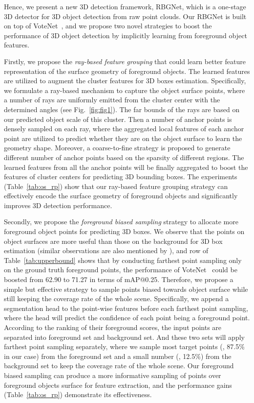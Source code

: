 \documentclass[final]{cvpr}
\begin{document}
Hence, we present a new 3D detection framework, RBGNet, which is a one-stage 3D detector for 3D object detection from raw point clouds. 
Our RBGNet is built on top of VoteNet~\cite{qi2019deep}, and we propose two novel strategies to boost the performance of 3D object detection by implicitly learning from foreground object features. 

Firstly, we propose the \textit{ray-based feature grouping} that could learn better feature representation of the surface geometry of foreground objects. The learned features are utilized to augment the cluster features for 3D boxes estimation. 
Specifically, we formulate a ray-based mechanism to capture the object surface points, where a number of rays are uniformly emitted from the cluster center with the determined angles (see Fig.~\ref{fig:fig1}). The far bounds of the rays are based on our predicted object scale of this cluster. 
Then a number of anchor points is densely sampled on each ray, where the aggregated local features of each anchor point are utilized to predict whether they are on the object surface to learn the geometry shape. 
Moreover, a coarse-to-fine strategy is proposed to generate different number of anchor points based on the sparsity of different regions. The learned features from all the anchor points will be finally aggregated to boost the features of cluster centers for predicting 3D bounding boxes. 
The experiments (Table~\ref{tab:os_rp}) show that our ray-based feature grouping strategy can effectively encode the surface geometry of foreground objects and significantly improves 3D detection performance.


Secondly, we propose the \textit{foreground biased sampling} strategy to allocate more foreground object points for predicting 3D boxes.
We observe that the points on object surfaces are more useful than those on the background for 3D box estimation (similar observations are also mentioned by \cite{yang20203dssd, shi2020pv}), and  row of Table~\ref{tab:upperbound} shows that by conducting farthest point sampling only on the ground truth foreground points, the performance of VoteNet~\cite{qi2019deep} could be boosted from 62.90 to 71.27 in terms of mAP@0.25.
Therefore, we propose a simple but effective strategy to sample points biased towards object surface while still keeping the coverage rate of the whole scene. 
Specifically, we append a segmentation head to the point-wise features before each farthest point sampling, where the head will predict the confidence of each point being a foreground point. According to the ranking of their foreground scores, the input points are separated into foreground set and background set. And these two sets will apply farthest point sampling separately, where we sample most target points (\ie, 87.5\% in our case) from the foreground set and a small number (\ie, 12.5\%) from the background set to keep the coverage rate of the whole scene. 
Our foreground biased sampling can produce a more informative sampling of points over foreground objects surface for feature extraction, and the performance gains (Table~\ref{tab:os_rp}) demonstrate its effectiveness.
\end{document}
